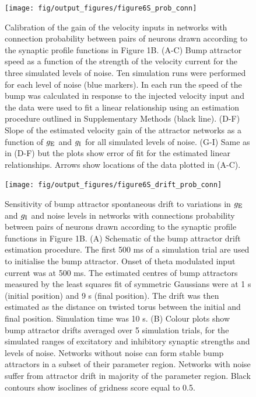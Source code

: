 \documentclass[a4paper,12pt]{article}
\newcommand{\ssc}[3]{\ensuremath{#1_{\text{#2}_{\text{#3}}}}}
\newcommand{\gE      }{\ssc{g}      {\scriptsize{E}}{}}
\newcommand{\gI      }{\ssc{g}      {\scriptsize{I}}{}}
\begin{document}
\begin{figure}[ht!]
    \internallinenumbers
    \centering
        \texttt{[image: fig/output\_figures/figure6S\_prob\_conn]}
    \caption{Calibration of the gain of the velocity inputs in networks with
    connection probability between pairs of neurons drawn according to the
    synaptic profile functions in Figure 1B. (A-C) Bump attractor speed as a
    function of the strength of the velocity current for the three simulated
    levels of noise. Ten simulation runs were performed for each level of noise
    (blue markers). In each run the speed of the bump was calculated in
    response to the injected velocity input and the data were used to fit a
    linear relationship using an estimation procedure outlined in Supplementary
    Methods (black line). (D-F) Slope of the estimated velocity gain of the
    attractor networks as a function of $\gE$ and $\gI$ for all simulated
    levels of noise. (G-I) Same as in (D-F) but the plots show error of fit for
    the estimated linear relationships. Arrows show locations of the data
    plotted in (A-C).}
\end{figure}

\clearpage

\begin{figure}[ht!]
    \internallinenumbers
    \centering
        \texttt{[image: fig/output\_figures/figure6S\_drift\_prob\_conn]}
    \caption{Sensitivity of bump attractor spontaneous drift to variations in
    $\gE$ and $\gI$ and noise levels in networks with connections probability
    between pairs of neurons drawn according to the synaptic profile functions
    in Figure 1B. (A) Schematic of the bump attractor drift estimation
    procedure. The first 500 ms of a simulation trial are used to initialise
    the bump attractor. Onset of theta modulated input current was at 500 ms.
    The estimated centres of bump attractors measured by the least squares fit
    of symmetric Gaussians were at 1 s (initial position) and 9 s (final
    position). The drift was then estimated as the distance on twisted torus
    between the initial and final position. Simulation time was 10 s. (B)
    Colour plots show bump attractor drifts averaged over 5 simulation trials,
    for the simulated ranges of excitatory and inhibitory synaptic strengths
    and levels of noise.  Networks without noise can form stable bump
    attractors in a subset of their parameter region. Networks with noise
    suffer from attractor drift in majority of the parameter region. Black
    contours show isoclines of gridness score equal to 0.5.}
\end{figure}
\end{document}
